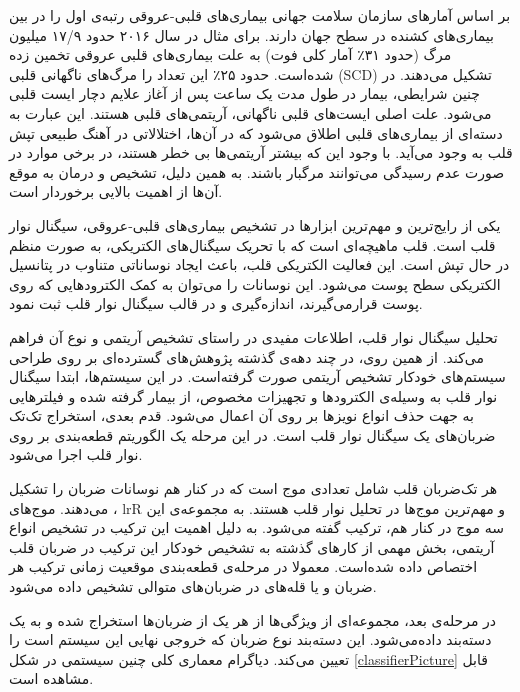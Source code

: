 
\pagebreak

بر اساس آمارهای سازمان سلامت جهانی بیماری‌های قلبی-عروقی  رتبه‌ی اول را در بین بیماری‌های کشنده در سطح جهان دارند. برای مثال در سال ۲۰۱۶ حدود ۱۷/۹ میلیون مرگ (حدود ۳۱٪ آمار کلی فوت) به علت بیماری‌های قلبی عروقی تخمین زده شده‌است. \cite{WHO} حدود ۲۵٪ این تعداد را مرگ‌های ناگهانی قلبی (SCD) تشکیل می‌دهند. \cite{Srinivasan2018} در چنین شرایطی، بیمار در طول مدت یک ساعت پس از آغاز علایم دچار ایست قلبی می‌شود. 
علت اصلی ایست‌های قلبی ناگهانی، آریتمی‌های قلبی هستند. \cite{Cleveland} این عبارت به دسته‌ای از بیماری‌های قلبی اطلاق می‌شود که در آن‌ها، اختلالاتی در آهنگ طبیعی تپش قلب به وجود می‌آید. با وجود این که بیشتر آریتمی‌ها بی خطر هستند، در برخی موارد در صورت عدم رسیدگی می‌توانند مرگبار باشند. به همین دلیل، تشخیص و درمان به موقع آن‌ها از اهمیت بالایی برخوردار است. 

یکی از رایج‌ترین و مهم‌ترین ابزارها در تشخیص بیماری‌های قلبی-عروقی، سیگنال نوار قلب  است. \cite {Elgendi2014} قلب ماهیچه‌ای است که با تحریک سیگنال‌های الکتریکی، به صورت منظم در حال تپش است. این فعالیت الکتریکی قلب، باعث ایجاد نوساناتی متناوب در پتانسیل الکتریکی سطح پوست می‌شود. این نوسانات  را می‌توان به کمک الکترودهایی که روی پوست قرارمی‌گیرند، اندازه‌گیری و در قالب سیگنال نوار قلب ثبت نمود. 

تحلیل سیگنال نوار قلب، اطلاعات مفیدی در راستای تشخیص آریتمی و نوع آن فراهم می‌کند. \cite{Mondejar} از همین روی، در چند دهه‌ی گذشته پژوهش‌های گسترده‌ای بر روی طراحی سیستم‌های خودکار تشخیص آریتمی صورت گرفته‌است. در این سیستم‌ها، ابتدا سیگنال نوار قلب به وسیله‌ی الکترودها و تجهیزات مخصوص، از بیمار گرفته شده و فیلترهایی به جهت حذف انواع نویزها بر روی آن اعمال می‌شود. قدم بعدی، استخراج تک‌تک ضربان‌های یک سیگنال نوار قلب است. در این مرحله یک الگوریتم قطعه‌بندی  بر روی نوار قلب اجرا می‌شود.

هر تک‌ضربان قلب شامل تعدادی موج است که در کنار هم نوسانات ضربان را تشکیل می‌دهند. موج‌های ، lr{R} و  مهم‌ترین موج‌ها در تحلیل نوار قلب هستند.\cite{Mondejar} به مجموعه‌ی این سه موج در کنار هم، ترکیب  گفته می‌شود. به دلیل اهمیت این ترکیب در تشخیص انواع آریتمی، بخش مهمی از کارهای گذشته به تشخیص خودکار این ترکیب در ضربان قلب اختصاص داده شده‌است. معمولا در مرحله‌ی قطعه‌بندی موقعیت زمانی ترکیب  هر ضربان و یا قله‌های  در ضربان‌های متوالی تشخیص داده می‌شود.

 در مرحله‌ی بعد، مجموعه‌ای از ویژگی‌ها از هر یک از ضربان‌ها استخراج شده و به یک دسته‌بند  داده‌می‌شود. این دسته‌بند نوع ضربان که خروجی نهایی این سیستم است را تعیین می‌کند. دیاگرام معماری کلی چنین سیستمی در شکل \ref{classifierPicture} قابل مشاهده است. 
 
